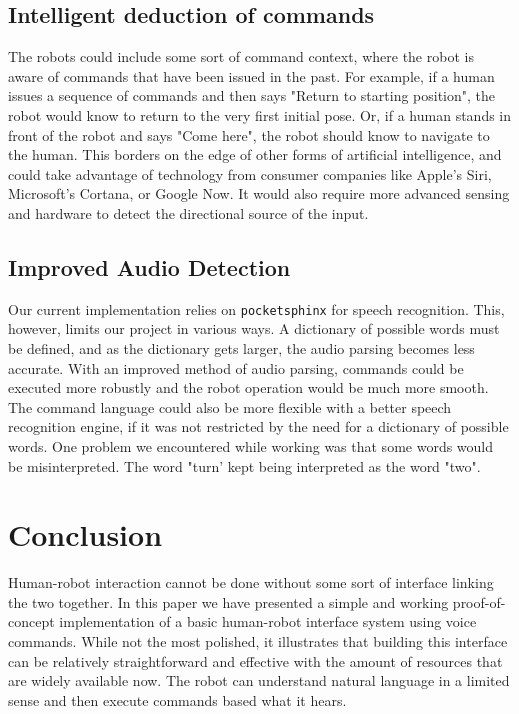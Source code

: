 \documentclass{article}
\begin{document}
\subsection{Intelligent deduction of commands}
The robots could include some sort of command context, where the robot is aware of commands that have been issued in the past. For example, if a human issues a sequence of commands and then says "Return to starting position", the robot would know to return to the very first initial pose. Or, if a human stands in front of the robot and says "Come here", the robot should know to navigate to the human. This borders on the edge of other forms of artificial intelligence, and could take advantage of technology from consumer companies like Apple's Siri, Microsoft's Cortana, or Google Now. It would also require more advanced sensing and hardware to detect the directional source of the input.
\subsection{Improved Audio Detection}
Our current implementation relies on \texttt{pocketsphinx} for speech recognition. This, however, limits our project in various ways. A dictionary of possible words must be defined, and as the dictionary gets larger, the audio parsing becomes less accurate. With an improved method of audio parsing, commands could be executed more robustly and the robot operation would be much more smooth. The command language could also be more flexible with a better speech recognition engine, if it was not restricted by the need for a dictionary of possible words. One problem we encountered while working was that some words would be misinterpreted. The word "turn' kept being interpreted as the word "two".

\section{Conclusion}
Human-robot interaction cannot be done without some sort of interface linking the two together. In this paper
we have presented a simple and working proof-of-concept implementation of a basic human-robot interface system using voice commands. While not the most polished, it illustrates that building this interface can be relatively straightforward and effective with the amount of resources that are widely available now. The robot can understand natural language in a limited sense and then execute commands based what it hears.\par
\end{document}
